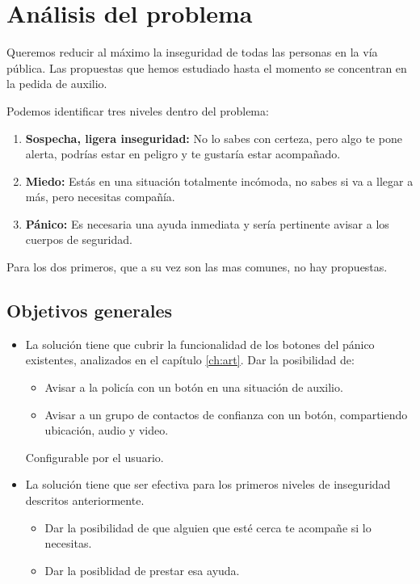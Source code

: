 \chapter{Análisis del problema}
 
Queremos reducir al máximo la inseguridad de todas las personas en la vía pública.
Las propuestas que hemos estudiado hasta el momento se concentran en la pedida de auxilio.

Podemos identificar tres niveles dentro del problema:
\begin{enumerate}
  \item \textbf{Sospecha, ligera inseguridad:} No lo sabes con certeza, pero algo te pone alerta, podrías estar en peligro y te gustaría estar acompañado.
  \item \textbf{Miedo:} Estás en una situación totalmente incómoda, no sabes si va a llegar a más, pero necesitas compañía.
  \item \textbf{Pánico:} Es necesaria una ayuda inmediata y sería pertinente avisar a los cuerpos de seguridad.
\end{enumerate}

Para los dos primeros, que a su vez son las mas comunes, no hay propuestas.

\section{Objetivos generales}
\begin{itemize}
  \item La solución tiene que cubrir la funcionalidad de los botones del pánico existentes, analizados en el capítulo \ref{ch:art}.
  Dar la posibilidad de: 
  \begin{itemize}
    \item Avisar a la policía con un botón en una situación de auxilio.
    \item Avisar a un grupo de contactos de confianza con un botón, compartiendo ubicación, audio y video.
  \end{itemize}
  Configurable por el usuario.
  \item La solución tiene que ser efectiva para los primeros niveles de inseguridad descritos anteriormente.
  \begin{itemize}
    \item Dar la posibilidad de que alguien que esté cerca te acompañe si lo necesitas.
    \item Dar la posiblidad de prestar esa ayuda.
  \end{itemize}
\end{itemize}